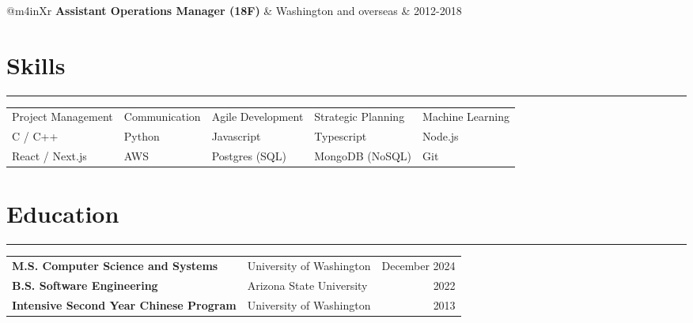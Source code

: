 \documentclass[letterpaper,11pt]{article}
\begin{document}
\begin{tabularx}{\linewidth}{@{}m{4in}Xr}
  \textbf{Assistant Operations Manager (18F)}                                     & Washington and overseas                               & 2012-2018                                                                          \\
\end{tabularx}

\vspace{-20px}
\section*{Skills}
\hrule
\begin{tabularx}{\linewidth}{@{}YYYYY@{}}
  Project Management & Communication & Agile Development & Strategic Planning & Machine Learning \\
  C / C++            & Python        & Javascript        & Typescript         & Node.js          \\
  React / Next.js    & AWS           & Postgres (SQL)    & MongoDB (NoSQL)    & Git              \\
\end{tabularx}

\vspace{-5px}
\section*{Education}
\hrule
\begin{tabularx}{\linewidth}{@{}XXr@{}}
  \textbf{M.S. Computer Science and Systems}     & University of Washington & December 2024 \\
  \textbf{B.S. Software Engineering}             & Arizona State University & 2022          \\
  \textbf{Intensive Second Year Chinese Program} & University of Washington & 2013          \\
\end{tabularx}
\end{document}

